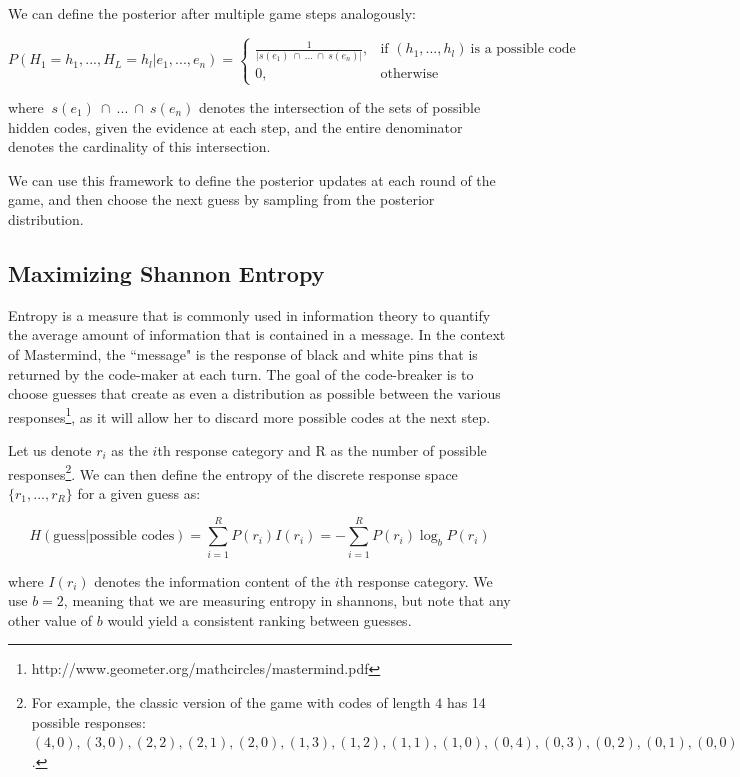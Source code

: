 \documentclass[11pt]{article}
\begin{document}
\noindent We can define the posterior after multiple game steps analogously:

\[
    P(H_1=h_1, ..., H_L=h_l | e_1, ..., e_n) = 
\begin{cases}
    \frac{1}{| s(e_1) \ \cap \ ... \ \cap \ s(e_n) |},& \text{if } (h_1, ..., h_l) \ \text{is a possible code}\\
    0,              & \text{otherwise}
\end{cases}
\]

\noindent where $\ s(e_1) \ \cap \ ... \ \cap \ s(e_n)$ denotes the intersection of the sets of possible hidden codes, given the evidence at each step, and the entire denominator denotes the cardinality of this intersection.

We can use this framework to define the posterior updates at each round of the game, and then choose the next guess by sampling from the posterior distribution.

\subsection{Maximizing Shannon Entropy}

Entropy is a measure that is commonly used in information theory to quantify the average amount of information that is contained in a message. In the context of Mastermind, the ``message" is the response of black and white pins that is returned by the code-maker at each turn. The goal of the code-breaker is to choose guesses that create as even a distribution as possible between the various responses\footnote{http://www.geometer.org/mathcircles/mastermind.pdf}, as it will allow her to discard more possible codes at the next step.

Let us denote $r_i$ as the $i$th response category and R as the number of possible responses\footnote{For example, the classic version of the game with codes of length $4$ has 14 possible responses: $(4, 0), (3, 0), (2, 2), (2, 1), (2, 0), (1, 3), (1, 2), (1, 1), (1, 0), (0, 4), (0, 3), (0, 2), (0, 1), (0, 0)$.}. We can then define the entropy of the discrete response space $\{r_1, ... , r_R\}$ for a given guess as:

\[
H(\text{guess} | \text{possible codes}) = \sum_{i=1}^R P(r_i) I(r_i) = - \sum_{i=1}^R P(r_i) \log_bP(r_i)
\]

\noindent where $I(r_i)$ denotes the information content of the $i$th response category. We use $b=2$, meaning that we are measuring entropy in shannons, but note that any other value of $b$ would yield a consistent ranking between guesses.
\end{document}
